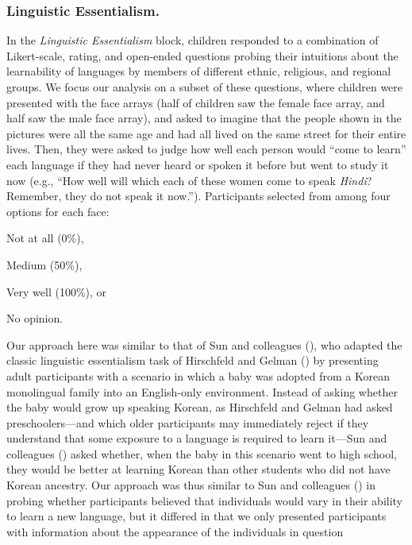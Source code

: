\documentclass{foushee-adapted-preprint}
\begin{document}
\subsubsection{Linguistic Essentialism.} 
In the \textit{Linguistic Essentialism} block, children responded to a combination of Likert-scale, rating, and open-ended questions probing their intuitions about the learnability of languages by members of different ethnic, religious, and regional groups. 
We focus our analysis on a subset of these questions, where children were presented with the face arrays (half of children saw the female face array, and half saw the male face array), and asked to imagine that the people shown in the pictures were all the same age and had all lived on the same street for their entire lives. 
Then, they were asked to judge how well each person would ``come to learn'' each language if they had never heard or spoken it before but went to study it now (e.g., ``How well will which each of these women come to speak \textit{Hindi}? Remember, they do not speak it now.''). 
Participants selected from among four options for each face:
\begin{inparaenum}[(a)]
    \item {Not at all (0\%)},
    \item {Medium (50\%)},
    \item {Very well (100\%)}, or 
    \item {No opinion}. 
\end{inparaenum}
Our approach here was similar to that of Sun and colleagues (\citeyear{sun2023essentialist}), who adapted the classic linguistic essentialism task of Hirschfeld and Gelman (\citeyear{hirschfeld1997young}) by presenting adult participants with a scenario in which a baby was adopted from a Korean monolingual family into an %
English-only environment. Instead of asking whether the baby would grow up speaking Korean, as Hirschfeld and Gelman had asked preschoolers---and which older participants may immediately reject if they understand that some exposure to a language is required to learn it---Sun and colleagues (\citeyear{sun2023essentialist}) asked whether, when the baby in this scenario went to high school, they would be better at learning Korean than other students who did not have Korean ancestry. 
Our approach was thus similar to Sun and colleagues (\citeyear{sun2023essentialist}) in probing whether participants believed that individuals would vary in their ability to learn a new language, but it differed in that we only presented participants with information about the appearance of the individuals in question %
\end{document}
